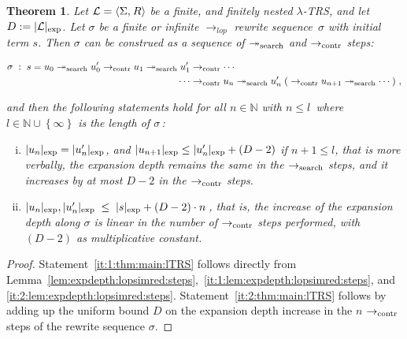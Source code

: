 \documentclass[
submission
]{dmtcs-episciences-tampered}
\newcommand{\funin}{\mathrel{:}}
\newcommand{\indap}[2]{#1 _{#2}}
\newcommand{\supap}[2]{#1 ^{#2}}
\newcommand{\pap}{\supap}
\newcommand{\nb}{\nobreakdash}
\newcommand{\nf}{\normalfont}
\newcommand{\sdefdby}{{:=}}
\newcommand{\defdby}{\mathrel{\sdefdby}}
\newcommand{\punc}[1]{\ensuremath{\hspace*{3pt}{#1}}}
\newcommand{\tuple}[1]{\langle #1 \rangle}
\newcommand{\tuplespace}{\hspace*{0.5pt}}
\newcommand{\pair}[2]{\tuple{#1, \tuplespace #2}}
\newcommand{\setexp}[1]{\left\{{#1}\right\}}
\newcommand{\nat}{\mathbb{N}}
\newcommand{\ater}{s}
\newcommand{\cter}{u}
\newcommand{\cteracc}{\cter'}
\newcommand{\cteri}{\indap{\cter}}
\newcommand{\cteracci}{\indap{\cteracc}}
\newcommand{\asig}{\Sigma}
\newcommand{\arules}{R}
\newcommand{\alTRS}{{\cal L}}
\newcommand{\TRS}{TRS}
\newcommand{\expdepth}[1]{\lvert{#1}\rvert_{\scriptexp}}
\newcommand{\slop}{\textit{lop}}\newcommand{\slopstar}{\pap{\slop}{*}}
\newcommand{\sred}{\to}
\newcommand{\sredi}{\indap{\sred}}
\newcommand{\smred}{\twoheadrightarrow}
\newcommand{\smredi}{\indap{\smred}}
\newcommand{\scriptexp}{\text{\nf exp}}
\newcommand{\scriptsearch}{\text{\nf search}}
\newcommand{\scriptcontract}{\text{\nf contr}}
\newcommand{\ssearchred}{\sredi{\scriptsearch}}
\newcommand{\ssearchmred}{\smredi{\scriptsearch}}
\newcommand{\searchmred}{\mathrel{\ssearchmred}}
\newcommand{\scontractred}{\sredi{\scriptcontract}}
\newcommand{\contractred}{\mathrel{\scontractred}}
\newcommand{\slopsimred}{\sredi{\slop}}
\newcommand{\arewseq}{\sigma}
\newcommand{\lTRS}{$\lambda$\hspace*{-0.5pt}\nb-\hspace*{-0.5pt}\TRS}
\theoremstyle{plain}
\newtheorem{theorem}{Theorem}
\theoremstyle{definition}
\begin{document}
\begin{theorem}\label{thm:main:lTRS}
  Let $\alTRS = \pair{\asig}{\arules}$ be a finite, and finitely nested \lTRS,
  and let $D \defdby \expdepth{\alTRS}$. Let $\arewseq$ be a finite or infinite $\slopsimred$ rewrite sequence~$\arewseq$ with initial term $\ater$.
  Then $\arewseq$ can be construed as a sequence of $\ssearchmred$ and $\scontractred$ steps: 
  \begin{center}
    $
  \begin{aligned}
    \arewseq \;\funin\; 
       \ater 
         = \cteri{0} 
             \searchmred
           \cteracci{0}
             \contractred  
           \cteri{1} 
             \searchmred
           \cteracci{1} & {}
             \contractred
               \cdots  
           \\
               \cdots & {}    
             \contractred
           \cteri{n} 
             \searchmred
           \cteracci{n}
             \; ( {}
             \contractred  
           \cteri{n+1} 
             \searchmred
               \cdots
             \: )
           \punc{,}
  \end{aligned}
    $   
  \end{center}
and then the following statements hold for all $n\in\nat$ with $n\le l\,$ where $l\in\nat\cup\setexp{\infty}$ is the length of $\arewseq\,$:
\begin{enumerate}[(i)]\setlength{\itemsep}{0ex}
    \item{}\label{it:1:thm:main:lTRS}
      $\expdepth{\cteri{n}} = \expdepth{\cteracci{n}}$,
      and 
      $\expdepth{\cteri{n+1}} 
         \le 
       \expdepth{\cteracci{n}} + (D-2)$
       if $n + 1\le l$,
      that is more verbally, the expansion depth remains the same in the $\ssearchred$ steps, and
      it increases by at most $D-2$ in the $\scontractred$ steps. 
    \item{}\label{it:2:thm:main:lTRS}  
      $\expdepth{\cteri{n}}, \expdepth{\cteracci{n}} \;\le\; \expdepth{\ater} + (D-2)\cdot n\,$,
      that is,
      the increase of the expansion depth along $\arewseq$ is linear
      in the number of $\scontractred$ steps performed, with $(D-2)$ as multiplicative constant. 
  \end{enumerate}  
\end{theorem}





\begin{proof}
  Statement~\eqref{it:1:thm:main:lTRS} 
  follows directly from Lemma~\ref{lem:expdepth:lopsimred:steps},~\eqref{it:1:lem:expdepth:lopsimred:steps}, and \eqref{it:2:lem:expdepth:lopsimred:steps}. 
  Statement~\eqref{it:2:thm:main:lTRS} follows by adding up the uniform bound $D$ 
  on the expansion depth increase in the $n$ $\scontractred$ steps of the rewrite sequence $\arewseq$.    
\end{proof}
\end{document}
